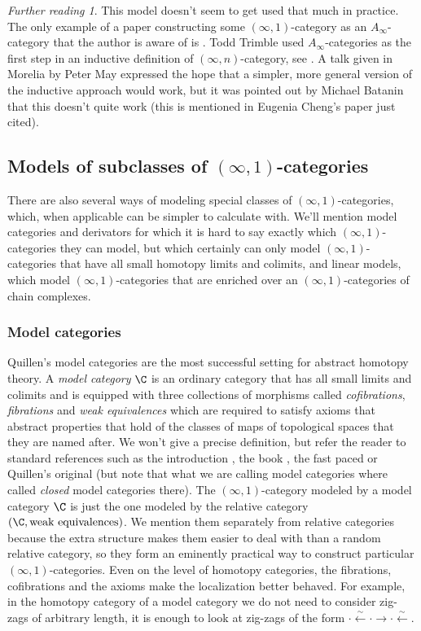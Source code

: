 \documentclass[12pt]{amsart}
\theoremstyle{definition} \newtheorem{definition}[theorem]{Definition}
\theoremstyle{remark} \newtheorem{remark}[theorem]{Remark}
\newtheorem*{further}{Further reading}
\numberwithin{equation}{section}
\newcommand{\oo}{\infty}
\newcommand{\io}{$(\oo,1)$}
\begin{document}
\begin{further}
  This model doesn't seem to get used that much in practice. The only
  example of a paper constructing some \io-category as an
  $A_\oo$-category that the author is aware of is \cite[Proposition
  1.4]{Ching}. Todd Trimble used $A_\oo$-categories as the first step
  in an inductive definition of $(\oo,n)$-category, see
  \cite{ChengOperadic}. A talk given in Morelia by Peter May
  \cite{MayMorelia} expressed the hope that a simpler, more general
  version of the inductive approach would work, but it was pointed out
  by Michael Batanin that this doesn't quite work (this is mentioned
  in Eugenia Cheng's paper just cited).
\end{further}

\subsection{Models of subclasses of \io-categories}

There are also several ways of modeling special classes of
\io-categories, which, when applicable can be simpler to calculate
with. We'll mention model categories and derivators for which it is
hard to say exactly which \io-categories they can model, but which
certainly can only model \io-categories that have all small homotopy
limits and colimits, and linear models, which model \io-categories
that are enriched over an \io-categories of chain complexes.

\subsubsection{Model categories}

Quillen's model categories are the most successful setting for
abstract homotopy theory. A \emph{model category} $\C$ is an ordinary
category that has all small limits and colimits and is equipped with
three collections of morphisms called \emph{cofibrations},
\emph{fibrations} and \emph{weak equivalences} which are required to
satisfy axioms that abstract properties that hold of the classes of
maps of topological spaces that they are named after. We won't give a
precise definition, but refer the reader to standard references such
as the introduction \cite{DwyerSpalinski}, the book \cite{Hovey}, the
fast paced \cite[Appendix A.2]{HTT} or Quillen's original
\cite{Quillen} (but note that what we are calling model categories
where called \emph{closed} model categories there). The \io-category
modeled by a model category $\C$ is just the one modeled by the
relative category $(\C, \text{weak equivalences})$. We mention them
separately from relative categories because the extra structure makes
them easier to deal with than a random relative category, so they form
an eminently practical way to construct particular \io-categories.
Even on the level of homotopy categories, the fibrations, cofibrations
and the axioms make the localization better behaved. For example, in
the homotopy category of a model category we do not need to consider
zig-zags of arbitrary length, it is enough to look at zig-zags of the
form $\cdot \xleftarrow{\sim} \cdot \to \cdot \xleftarrow{\sim}$.
\end{document}
